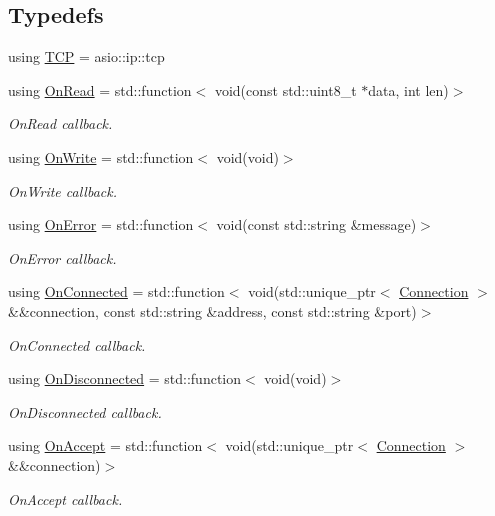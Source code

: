 \subsection*{Typedefs}
\begin{DoxyCompactItemize}
\item 
using \hyperlink{namespaceTcpBackend_a2c4e5e89eff1cb2603e717e037161b9b}{T\+CP} = asio\+::ip\+::tcp
\item 
using \hyperlink{namespaceTcpBackend_a7d2c9f63e8017af705255d4ed08264a7}{On\+Read} = std\+::function$<$ void(const std\+::uint8\+\_\+t $\ast$data, int len)$>$
\begin{DoxyCompactList}\small\item\em On\+Read callback. \end{DoxyCompactList}\item 
using \hyperlink{namespaceTcpBackend_a670c71abc926680e1ea574a5f3a99135}{On\+Write} = std\+::function$<$ void(void)$>$
\begin{DoxyCompactList}\small\item\em On\+Write callback. \end{DoxyCompactList}\item 
using \hyperlink{namespaceTcpBackend_a17e8f044749312a6692cd0135565cbc4}{On\+Error} = std\+::function$<$ void(const std\+::string \&message)$>$
\begin{DoxyCompactList}\small\item\em On\+Error callback. \end{DoxyCompactList}\item 
using \hyperlink{namespaceTcpBackend_afa30fa9a706436148fb2857a2174e625}{On\+Connected} = std\+::function$<$ void(std\+::unique\+\_\+ptr$<$ \hyperlink{classTcpBackend_1_1Connection}{Connection} $>$ \&\&connection, const std\+::string \&address, const std\+::string \&port)$>$
\begin{DoxyCompactList}\small\item\em On\+Connected callback. \end{DoxyCompactList}\item 
using \hyperlink{namespaceTcpBackend_a2ce9b1a1f46bfa6c4b1ad38c8aa262a6}{On\+Disconnected} = std\+::function$<$ void(void)$>$
\begin{DoxyCompactList}\small\item\em On\+Disconnected callback. \end{DoxyCompactList}\item 
using \hyperlink{namespaceTcpBackend_a8aed04c0b1d33eb06aec746da4452484}{On\+Accept} = std\+::function$<$ void(std\+::unique\+\_\+ptr$<$ \hyperlink{classTcpBackend_1_1Connection}{Connection} $>$ \&\&connection)$>$
\begin{DoxyCompactList}\small\item\em On\+Accept callback. \end{DoxyCompactList}\end{DoxyCompactItemize}
